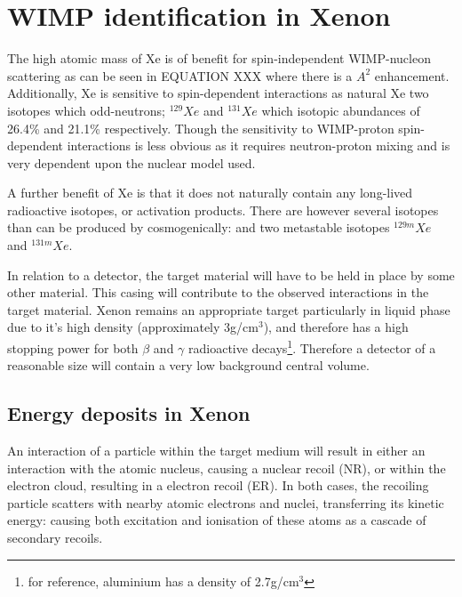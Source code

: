 \section{WIMP identification in Xenon}
\label{sec:wimps_with_xenon}

\par
The high atomic mass of Xe is of benefit for spin-independent WIMP-nucleon scattering as can be seen in EQUATION XXX where there is a $A^2$ enhancement.
Additionally, Xe is sensitive to spin-dependent interactions as natural Xe two isotopes which odd-neutrons; ${}^{129}Xe$ and ${}^{131}Xe$ which isotopic abundances of 26.4\% and 21.1\% respectively.
Though the sensitivity to WIMP-proton spin-dependent interactions is less obvious as it requires neutron-proton mixing and is very dependent upon the nuclear model used.

\par
A further benefit of Xe is that it does not naturally contain any long-lived radioactive isotopes, or activation products.
There are however several isotopes than can be produced by cosmogenically: and two metastable isotopes ${}^{129m}Xe$ and ${}^{131m}Xe$.


\par
In relation to a detector, the target material will have to be held in place by some other material.
This casing will contribute to the observed interactions in the target material.
Xenon remains an appropriate target particularly in liquid phase due to it's high density (approximately 3g/cm${}^{3}$), and therefore has a high stopping power for both $\beta$ and $\gamma$ radioactive decays\footnote{for reference, aluminium has a density of 2.7g/cm${}^{3}$}.
Therefore a detector of a reasonable size will contain a very low background central volume.


\subsection{Energy deposits in Xenon}
\par
An interaction of a particle within the target medium will result in either an interaction with the atomic nucleus, causing a nuclear recoil (NR), or within the electron cloud, resulting in a electron recoil (ER).
In both cases, the recoiling particle scatters with nearby atomic electrons and nuclei, transferring its kinetic energy: causing both excitation and ionisation of these atoms as a cascade of secondary recoils.

\par


